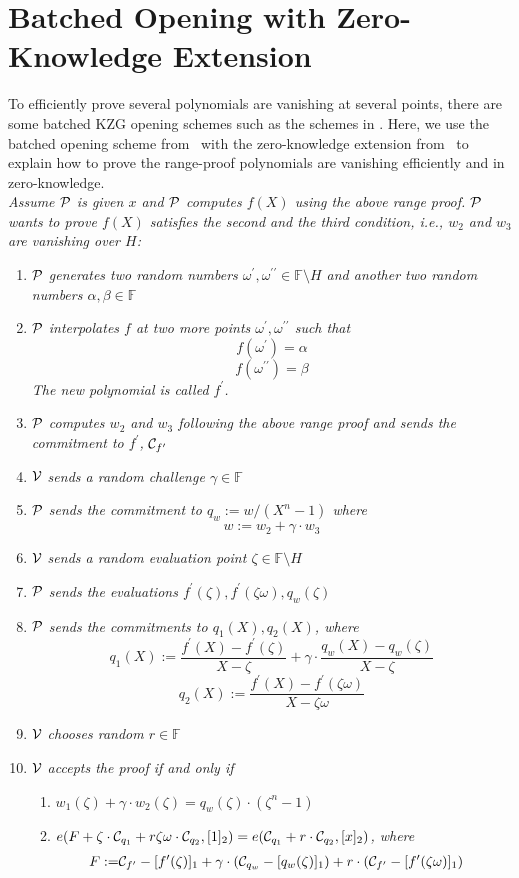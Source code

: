 \section{Batched Opening with Zero-Knowledge Extension}
\label{sec:kgzzkp}
To efficiently prove several polynomials are vanishing at several points, there are some batched KZG opening schemes such as the schemes in \cite{plonk,bdfg,fflonk}. Here, we use the batched opening scheme from~\cite{plonk} with the zero-knowledge extension from~\cite{rangeproof} to explain how to prove the range-proof polynomials are vanishing efficiently and in zero-knowledge. \\
\textit{Assume $\mathcal{P}$ is given $x$ and $\mathcal{P}$ computes $f(X)$ using the above range proof. $\mathcal{P}$ wants to prove $f(X)$ satisfies the second and the third condition, i.e., $w_2$ and $w_3$ are vanishing over $H$:}
\begin{enumerate}
    \item $\mathcal{P}$ \textit{generates two random numbers $\omega^{\prime},\omega^{\prime\prime}\in\mathbb{F}\setminus{H}$ and another two random numbers $\alpha,\beta\in\mathbb{F}$}
    \item $\mathcal{P}$ \textit{interpolates $f$ at two more points ${\omega^{\prime},\omega^{\prime\prime}}$ such that}
    \[ f(\omega^{\prime})=\alpha \]
    \[ f(\omega^{\prime\prime})=\beta \]
    \textit{The new polynomial is called $f^\prime$.}
    \item $\mathcal{P}$ \textit{computes $w_2$ and $w_3$ following the above range proof and sends the commitment to $f^\prime$,} $\mathcal{C}_{f^\prime}$
    \item $\mathcal{V}$ \textit{sends a random challenge $\gamma\in\mathbb{F}$}
    \item $\mathcal{P}$ \textit{sends the commitment to $q_w:=w/(X^n-1)$ where}
    \[ w:=w_2+\gamma\cdot{w_3} \]
    \item $\mathcal{V}$ \textit{sends a random evaluation point $\zeta\in\mathbb{F}\setminus{H}$}
    \item $\mathcal{P}$ \textit{sends the evaluations $f^\prime(\zeta),f^\prime(\zeta\omega),q_w(\zeta)$}
    \item $\mathcal{P}$ \textit{sends the commitments to $q_1(X),q_2(X)$, where}
    \[ q_1(X):=\frac{f^\prime(X)-f^\prime(\zeta)}{X-\zeta}+\gamma\cdot\frac{q_w(X)-q_w(\zeta)}{X-\zeta} \]
    \[ q_2(X):=\frac{f^\prime(X)-f^\prime(\zeta\omega)}{X-\zeta\omega} \]
    \item $\mathcal{V}$ \textit{chooses random $r\in\mathbb{F}$}
    \item $\mathcal{V}$ \textit{accepts the proof if and only if}
    \begin{enumerate}
    	\item $w_1(\zeta)+\gamma\cdot{w_2(\zeta)}=q_w(\zeta)\cdot(\zeta^n-1)$
    	\item $e(F+\zeta\cdot\mathcal{C}_{q_1}+r\zeta\omega\cdot\mathcal{C}_{q_2},[1]_2)=e(\mathcal{C}_{q_1}+r\cdot\mathcal{C}_{q_2},[x]_2)$\textit{, where}
    	\begin{align*}
    		F:=&\mathcal{C}_{f^\prime}-[f^\prime(\zeta)]_1+\gamma\cdot(\mathcal{C}_{q_w}-[q_w(\zeta)]_1)+r\cdot(\mathcal{C}_{f^\prime}-[f^\prime(\zeta\omega)]_1)
    	\end{align*}
    \end{enumerate}
\end{enumerate}


